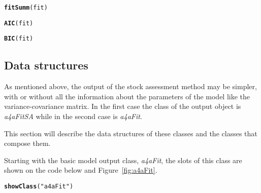\documentclass[a4paper,english,10pt]{article}\usepackage[]{graphicx}\usepackage[]{color}
\makeatletter
\newcommand{\hlstr}[1]{\textcolor[rgb]{0.192,0.494,0.8}{#1}}%
\newcommand{\hlstd}[1]{\textcolor[rgb]{0.345,0.345,0.345}{#1}}%
\newcommand{\hlkwd}[1]{\textcolor[rgb]{0.737,0.353,0.396}{\textbf{#1}}}%
\newenvironment{kframe}{%
 \def\at@end@of@kframe{}%
 \ifinner\ifhmode%
  \def\at@end@of@kframe{\end{minipage}}%
  \begin{minipage}{\columnwidth}%
 \fi\fi%
 \def\FrameCommand##1{\hskip\@totalleftmargin \hskip-\fboxsep
 \colorbox{shadecolor}{##1}\hskip-\fboxsep
     \hskip-\linewidth \hskip-\@totalleftmargin \hskip\columnwidth}%
 \MakeFramed {\advance\hsize-\width
   \@totalleftmargin\z@ \linewidth\hsize
   \@setminipage}}%
 {\par\unskip\endMakeFramed%
 \at@end@of@kframe}
\newenvironment{knitrout}{}{} %
\newcommand{\class}[1]{{\textit{#1}}}
\makeatother
\begin{document}
\begin{knitrout}
\color{fgcolor}\begin{kframe}
\begin{alltt}
\hlkwd{fitSumm}\hlstd{(fit)}
\end{alltt}


{\ttfamily\noindent\bfseries{}}\begin{alltt}
\hlkwd{AIC}\hlstd{(fit)}
\end{alltt}


{\ttfamily\noindent\bfseries\color{errorcolor}{\#\# Error: object 'fit' not found}}\begin{alltt}
\hlkwd{BIC}\hlstd{(fit)}
\end{alltt}


{\ttfamily\noindent\bfseries\color{errorcolor}{\#\# Error: object 'fit' not found}}\end{kframe}
\end{knitrout}

\subsection{Data structures}

As mentioned above, the output of the stock assessment method may be simpler, with or without all the information about the parameters of the model like the variance-covariance matrix. In the first case the class of the output object is \class{a4aFitSA} while in the second case is \class{a4aFit}.

This section will describe the data structures of these classes and the classes that compose them.

Starting with the basic model output class, \class{a4aFit}, the slots of this class are shown on the code below and Figure~\ref{fig:a4aFit}.

\begin{knitrout}
\color{fgcolor}\begin{kframe}
\begin{alltt}
\hlkwd{showClass}\hlstd{(}\hlstr{"a4aFit"}\hlstd{)}
\end{alltt}


{\ttfamily\noindent\bfseries{}}\end{kframe}
\end{knitrout}
\end{document}
